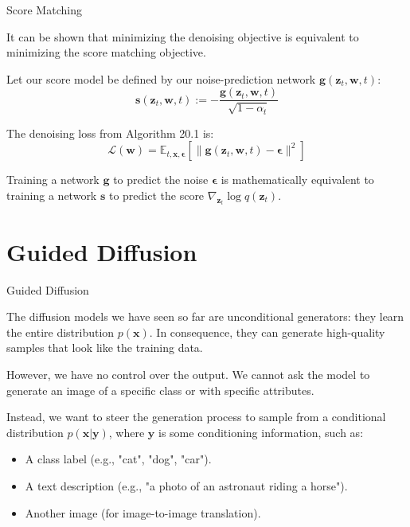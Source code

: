 \documentclass[aspectratio=169,xcolor=dvipsnames]{beamer}
\theoremstyle{named}
\begin{document}

\begin{frame}{Score Matching}

It can be shown that minimizing the denoising objective is equivalent to minimizing the score matching objective.

\vspace{0.5em}

Let our score model be defined by our noise-prediction network $\mathbf{g}(\mathbf{z}_t, \mathbf{w}, t)$:
    $$ \mathbf{s}(\mathbf{z}_t, \mathbf{w}, t) := -\frac{\mathbf{g}(\mathbf{z}_t, \mathbf{w}, t)}{\sqrt{1-\alpha_t}} $$

The \alert{denoising loss} from Algorithm 20.1 is:
    $$ \mathcal{L}(\mathbf{w}) = \mathbb{E}_{t, \mathbf{x}, \boldsymbol{\epsilon}} \left[ \| \mathbf{g}(\mathbf{z}_t, \mathbf{w}, t) - \boldsymbol{\epsilon} \|^2 \right] $$

Training a network $\mathbf{g}$ to predict the noise $\boldsymbol{\epsilon}$ is mathematically equivalent to training a network $\mathbf{s}$ to predict the score $\nabla_{\mathbf{z}_t} \log q(\mathbf{z}_t)$.

\end{frame}

\section{Guided Diffusion}

\begin{frame}{Guided Diffusion}

The diffusion models we have seen so far are \alert{unconditional generators}: they learn the entire distribution $p(\mathbf{x})$. In consequence, they can generate high-quality samples that look like the training data.

\vspace{1em}

However, we have \alert{no control over the output}. We cannot ask the model to generate an image of a specific class or with specific attributes.

\vspace{1em}

Instead, we want to steer the generation process to sample from a \alert{conditional distribution} $p(\mathbf{x}|\mathbf{y})$, where $\mathbf{y}$ is some conditioning information, such as:
\begin{itemize}
    \item A class label (e.g., "cat", "dog", "car").
    \item A text description (e.g., "a photo of an astronaut riding a horse").
    \item Another image (for image-to-image translation).
\end{itemize}

\end{frame}
\end{document}
